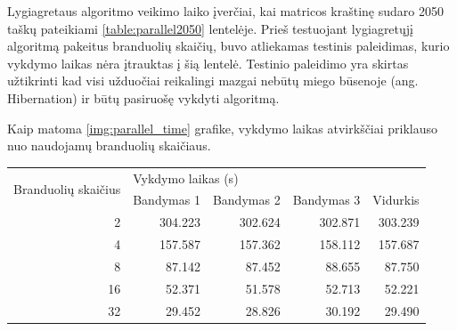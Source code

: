 \documentclass{VUMIFPSbakalaurinis}
\begin{document}
Lygiagretaus algoritmo veikimo laiko įverčiai, kai matricos kraštinę sudaro 2050 taškų pateikiami \ref{table:parallel2050} lentelėje. 
Prieš testuojant lygiagretųjį algoritmą pakeitus branduolių skaičių, buvo atliekamas testinis paleidimas, kurio vykdymo laikas nėra įtrauktas į šią lentelė. 
Testinio paleidimo yra skirtas užtikrinti kad visi užduočiai reikalingi mazgai nebūtų miego būsenoje (ang. Hibernation) ir būtų pasiruošę vykdyti algoritmą.

Kaip matoma \ref{img:parallel_time} grafike, vykdymo laikas atvirkščiai priklauso nuo naudojamų branduolių skaičiaus.

\begin{table}[H]
    \begin{tabular}{|r|rrrr|}
        \hline
        \multicolumn{1}{|l|}{\multirow{2}{*}{Branduolių skaičius}} & \multicolumn{4}{l|}{Vykdymo laikas (s)}                                                                                                     \\ \cline{2-5}
        \multicolumn{1}{|l|}{}                                     & \multicolumn{1}{l|}{Bandymas 1}         & \multicolumn{1}{l|}{Bandymas 2} & \multicolumn{1}{l|}{Bandymas 3} & \multicolumn{1}{l|}{Vidurkis} \\ \hline
        2                                                          & \multicolumn{1}{r|}{304.223}            & \multicolumn{1}{r|}{302.624}    & \multicolumn{1}{r|}{302.871}    & 303.239                       \\ \hline
        4                                                          & \multicolumn{1}{r|}{157.587}            & \multicolumn{1}{r|}{157.362}    & \multicolumn{1}{r|}{158.112}    & 157.687                       \\ \hline
        8                                                          & \multicolumn{1}{r|}{87.142}             & \multicolumn{1}{r|}{87.452}     & \multicolumn{1}{r|}{88.655}     & 87.750                        \\ \hline
        16                                                         & \multicolumn{1}{r|}{52.371}             & \multicolumn{1}{r|}{51.578}     & \multicolumn{1}{r|}{52.713}     & 52.221                        \\ \hline
        32                                                         & \multicolumn{1}{r|}{29.452}             & \multicolumn{1}{r|}{28.826}     & \multicolumn{1}{r|}{30.192}     & 29.490                        \\ \hline

\end{tabular}
\end{table}
\end{document}
